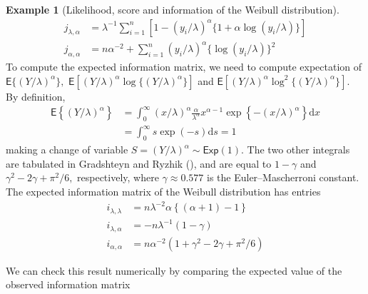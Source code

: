 \documentclass[
  11pt,
  letterpaper,
]{scrbook}
\theoremstyle{definition}
\newtheorem{example}{Example}[chapter]
\theoremstyle{plain}
\theoremstyle{plain}
\theoremstyle{plain}
\theoremstyle{definition}
\theoremstyle{definition}
\theoremstyle{plain}
\theoremstyle{plain}
\theoremstyle{remark}
\begin{document}
\begin{example}[Likelihood, score and information of the Weibull
distribution]
\begin{align*}
j_{\lambda, \alpha} &= \lambda^{-1}\sum_{i=1}^n [1-(y_i/\lambda)^\alpha\{1+\alpha\log(y_i/\lambda)\}] \\
j_{\alpha,\alpha} &= n\alpha^{-2} + \sum_{i=1}^n (y_i/\lambda)^\alpha \{\log(y_i/\lambda)\}^2
\end{align*} To compute the expected information matrix, we need to
compute expectation of \(\mathsf{E}\{(Y/\lambda)^\alpha\},\)
\(\mathsf{E}[(Y/\lambda)^\alpha\log\{(Y/\lambda)^\alpha\}]\) and
\(\mathsf{E}[(Y/\lambda)^\alpha\log^2\{(Y/\lambda)^\alpha\}].\) By
definition, \begin{align*}
\mathsf{E}\left\{(Y/\lambda)^\alpha\right\} & = \int_0^\infty (x/\lambda)^\alpha \frac{\alpha}{\lambda^\alpha} x^{\alpha-1}\exp\left\{-(x/\lambda)^\alpha\right\} \mathrm{d} x \\
 &= \int_0^\infty s\exp(-s) \mathrm{d} s =1
\end{align*} making a change of variable
\(S = (Y/\lambda)^\alpha\sim \mathsf{Exp}(1).\) The two other integrals
are tabulated in Gradshteyn and Ryzhik
(), and are equal to
\(1-\gamma\) and \(\gamma^2-2\gamma + \pi^2/6,\) respectively, where
\(\gamma \approx 0.577\) is the Euler--Mascherroni constant. The
expected information matrix of the Weibull distribution has entries
\begin{align*}
i_{\lambda, \lambda} & = n \lambda^{-2}\alpha\left\{ (\alpha+1)-1\right\} \\
i_{\lambda, \alpha} & = -n\lambda^{-1} (1-\gamma) \\
i_{\alpha, \alpha} & = n\alpha^{-2}(1 + \gamma^2-2\gamma+\pi^2/6)
\end{align*}

We can check this result numerically by comparing the expected value of
the observed information matrix


\end{example}
\end{document}
